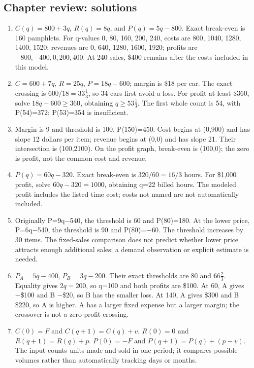 \documentclass[11pt,letterpaper]{article}
\begin{document}
{\subsection*{Chapter review: solutions}
\begin{enumerate}
\item $C(q)=800+3q$, $R(q)=8q$, and $P(q)=5q-800$. Exact break-even is 160 pamphlets. For q-values 0, 80, 160, 200, 240, costs are 800, 1040, 1280, 1400, 1520; revenues are 0, 640, 1280, 1600, 1920; profits are $-800,-400,0,200,400$. At 240 sales, \$400 remains after the costs included in this model.
\item $C=600+7q$, $R=25q$, $P=18q-600$; margin is \$18 per car. The exact crossing is $600/18=33\tfrac13$, so 34 cars first avoid a loss. For profit at least \$360, solve $18q-600\geq360$, obtaining $q\geq53\tfrac13$. The first whole count is 54, with P(54)=372; P(53)=354 is insufficient.
\item Margin is 9 and threshold is 100. P(150)=450. Cost begins at (0,900) and has slope 12 dollars per item; revenue begins at (0,0) and has slope 21. Their intersection is (100,2100). On the profit graph, break-even is (100,0); the zero is profit, not the common cost and revenue.
\item $P(q)=60q-320$. Exact break-even is $320/60=16/3$ hours. For \$1,000 profit, solve $60q-320=1000$, obtaining q=22 billed hours. The modeled profit includes the listed time cost; costs not named are not automatically included.
\item Originally P=9q\ensuremath{-}540, the threshold is 60 and P(80)=180. At the lower price, P=6q\ensuremath{-}540, the threshold is 90 and P(80)=\ensuremath{-}60. The threshold increases by 30 items. The fixed-sales comparison does not predict whether lower price attracts enough additional sales; a demand observation or explicit estimate is needed.
\item $P_A=5q-400$, $P_B=3q-200$. Their exact thresholds are 80 and $66\tfrac23$. Equality gives $2q=200$, so q=100 and both profits are \$100. At 60, A gives \ensuremath{-}\$100 and B \ensuremath{-}\$20, so B has the smaller loss. At 140, A gives \$300 and B \$220, so A is higher. A has a larger fixed expense but a larger margin; the crossover is not a zero-profit crossing.
\item $C(0)=F$ and $C(q+1)=C(q)+v$. $R(0)=0$ and $R(q+1)=R(q)+p$. $P(0)=-F$ and $P(q+1)=P(q)+(p-v)$. The input counts units made and sold in one period; it compares possible volumes rather than automatically tracking days or months.

\end{enumerate}}
\end{document}
